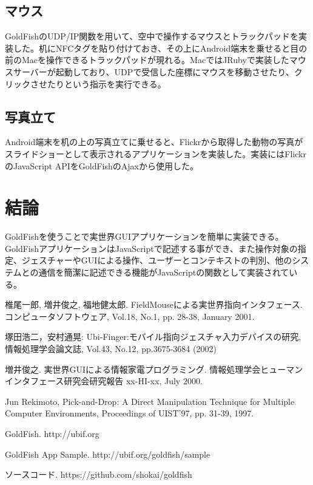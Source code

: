 \subsection{マウス}
GoldFishのUDP/IP関数を用いて、空中で操作するマウスとトラックパッドを実装した。机にNFCタグを貼り付けておき、その上にAndroid端末を乗せると目の前のMacを操作できるトラックパッドが現れる。MacではJRubyで実装したマウスサーバーが起動しており、UDPで受信した座標にマウスを移動させたり、クリックさせたりという指示を実行できる。


\subsection{写真立て}
Android端末を机の上の写真立てに乗せると、Flickrから取得した動物の写真がスライドショーとして表示されるアプリケーションを実装した。実装にはFlickrのJavaScript APIをGoldFishのAjaxから使用した。


\section{結論}
GoldFishを使うことで実世界GUIアプリケーションを簡単に実装できる。GoldFishアプリケーションはJavaScriptで記述する事ができ、また操作対象の指定、ジェスチャーやGUIによる操作、ユーザーとコンテキストの判別、他のシステムとの通信を簡潔に記述できる機能がJavaScriptの関数として実装されている。


\begin{thebibliography}{10}

椎尾一郎, 増井俊之, 福地健太郎. FieldMouseによる実世界指向インタフェース. コンピュータソフトウェア, Vol.18, No.1, pp. 28-38, January 2001.

塚田浩二，安村通晃: Ubi-Finger:モバイル指向ジェスチャ入力デバイスの研究, 情報処理学会論文誌, Vol.43, No.12, pp.3675-3684 (2002)

増井俊之. 実世界GUIによる情報家電プログラミング. 情報処理学会ヒューマンインタフェース研究会研究報告 xx-HI-xx, July 2000.

Jun Rekimoto, Pick-and-Drop: A Direct Manipulation Technique for Multiple Computer Environments, Proceedings of UIST'97, pp. 31-39, 1997.

GoldFish. http://ubif.org

GoldFish App Sample. http://ubif.org/goldfish/sample

ソースコード. https://github.com/shokai/goldfish

\end{thebibliography}

